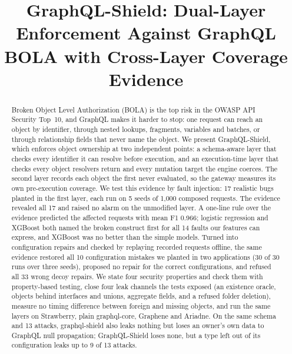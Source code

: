 \documentclass[conference]{IEEEtran}
\begin{document}
\title{GraphQL-Shield: Dual-Layer Enforcement Against GraphQL BOLA with Cross-Layer Coverage Evidence}

\author{
\IEEEauthorblockN{[Author 1]}
\and
\IEEEauthorblockN{[Author 2]}
\and
\IEEEauthorblockN{[Author 3]}
}

\maketitle

\begin{abstract}
Broken Object Level Authorization (BOLA) is the top risk in the OWASP API Security Top~10, and GraphQL makes it harder to stop: one request can reach an object by identifier, through nested lookups, fragments, variables and batches, or through relationship fields that never name the object. We present GraphQL-Shield, which enforces object ownership at two independent points: a schema-aware layer that checks every identifier it can resolve before execution, and an execution-time layer that checks every object resolvers return and every mutation target the engine coerces. The second layer records each object the first never evaluated, so the gateway measures its own pre-execution coverage. We test this evidence by fault injection: 17 realistic bugs planted in the first layer, each run on 5 seeds of 1,000 composed requests. The evidence revealed all 17 and raised no alarm on the unmodified layer. A one-line rule over the evidence predicted the affected requests with mean F1 0.966; logistic regression and XGBoost both named the broken construct first for all 14 faults our features can express, and XGBoost was no better than the simple models. Turned into configuration repairs and checked by replaying recorded requests offline, the same evidence restored all 10 configuration mistakes we planted in two applications (30 of 30 runs over three seeds), proposed no repair for the correct configurations, and refused all 33 wrong decoy repairs. We state four security properties and check them with property-based testing, close four leak channels the tests exposed (an existence oracle, objects behind interfaces and unions, aggregate fields, and a refused folder deletion), measure no timing difference between foreign and missing objects, and run the same layers on Strawberry, plain graphql-core, Graphene and Ariadne. On the same schema and 13 attacks, graphql-shield also leaks nothing but loses an owner's own data to GraphQL null propagation; GraphQL-Shield loses none, but a type left out of its configuration leaks up to 9 of 13 attacks.
\end{abstract}
\end{document}
